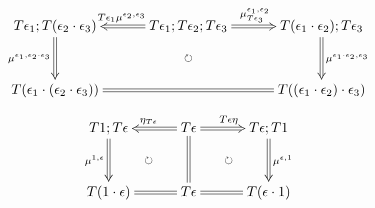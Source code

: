 \documentclass[12pt]{article}
\begin{document}
\pagestyle{empty}

\begin{align*}
  \vcenter{
    \xymatrix@=30pt{
      T \epsilon_1; T (\epsilon_2 \cdot \epsilon_3)
      \ar@{=>}[d]_{\mu^{\epsilon_1, \epsilon_2 \cdot \epsilon_3}}
      &
      T \epsilon_1; T \epsilon_2; T \epsilon_3
      \ar@{=>}[l]_{T \epsilon_1 \mu^{\epsilon_2, \epsilon_3}}
      \ar@{=>}[r]^{\mu^{\epsilon_1, \epsilon_2}_{T \epsilon_3}}
      &
      T (\epsilon_1 \cdot \epsilon_2); T \epsilon_3
      \ar@{=>}[d]^{\mu^{\epsilon_1 \cdot \epsilon_2, \epsilon_3}}
      \\
      T (\epsilon_1 \cdot (\epsilon_2 \cdot \epsilon_3))
      \ar@{=}[rr]
      & \ar@{}[u]|{\circlearrowright} &
      T ((\epsilon_1 \cdot \epsilon_2) \cdot \epsilon_3)
    }
  }
\end{align*}
\begin{align*}
  \vcenter{
    \xymatrix@=30pt{
      T 1; T \epsilon
      \ar@{=>}[d]_{\mu^{1, \epsilon}}
      &
      T \epsilon \ar@{=}[d]
      \ar@{=>}[l]_{\eta_{T \epsilon}}
      \ar@{=>}[r]^{T \epsilon \eta}
      &
      T \epsilon; T 1
      \ar@{=>}[d]^{\mu^{\epsilon, 1}}
      \\
      T (1 \cdot \epsilon)
      \ar@{}[ru]|{\circlearrowright}
      \ar@{=}[r]
      & T \epsilon &
      T (\epsilon \cdot 1)
      \ar@{}[lu]|{\circlearrowright}
      \ar@{=}[l]
    }
  }
\end{align*}
\end{document}
